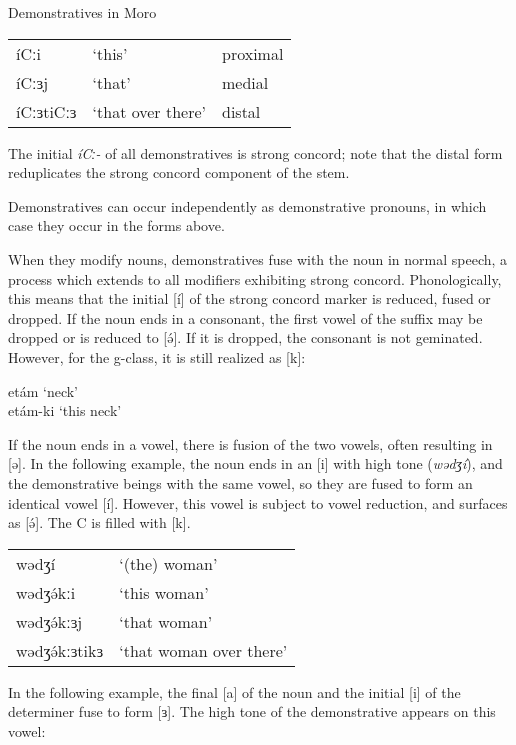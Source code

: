 \ea Demonstratives in Moro\\
\begin{tabular}[t]{lll}
íCːi		&	`this’	 			&	proximal\\
íCːɜj		&	`that’	 			&	medial\\
íCːɜtiCːɜ	&	`that over there’	&	distal\\
\end{tabular}
\z %
The initial \textit{íCː-} of all demonstratives is strong concord; note that the distal form reduplicates the strong concord component of the stem.

Demonstratives can occur independently as demonstrative pronouns, in which case they occur in the forms above.

When they modify nouns, demonstratives fuse with the noun in normal speech, a process which extends to all modifiers exhibiting strong concord. Phonologically, this means that the initial [í] of the strong concord marker is reduced, fused or dropped. If the noun ends in a consonant, the first vowel of the suffix may be dropped or is reduced to [ə́]. If it is dropped, the consonant is not geminated. However, for the g-class, it is still realized as [k]:

\ea		etám	`neck’		\\
		etám-ki	`this neck’	
	 \z 

If the noun ends in a vowel, there is fusion of the two vowels, often resulting in [ə]. In the following example, the noun ends in an [i] with high tone (\textit{wədʒí}), and the demonstrative beings with the same vowel, so they are fused to form an identical vowel [í]. However, this vowel is subject to vowel reduction, and surfaces as [ə́]. The C is filled with [k]. 

\ea \begin{tabular}[t]{ll}
	wədʒí		&	`(the) woman’ \\
	wədʒə́kːi	&	`this woman’\\
	wədʒə́kːɜj	& 	`that woman’\\
	wədʒə́kːɜtikɜ &		`that woman over there’\\
	\end{tabular}
\z 

In the following example, the final [a] of the noun and the initial [i] of the determiner fuse to form [ɜ]. The high tone of the demonstrative appears on this vowel:

